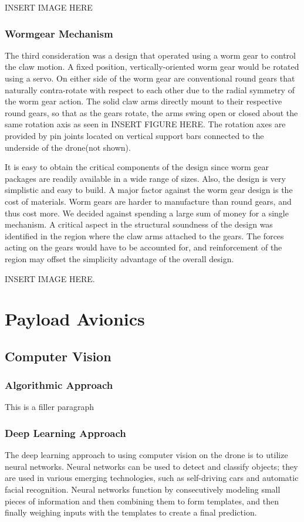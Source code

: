 			INSERT IMAGE HERE

		\subsubsection{Wormgear Mechanism}
			The third consideration was a design that operated using a worm gear to control the claw motion. A fixed position, vertically-oriented worm gear would be rotated using a servo. On either side of the worm gear are conventional round gears that naturally contra-rotate with respect to each other due to the radial symmetry of the worm gear action. The solid claw arms directly mount to their respective round gears, so that as the gears rotate, the arms swing open or closed about the same rotation axis as seen in INSERT FIGURE HERE. The rotation axes are provided by pin joints located on vertical support bars connected to the underside of the drone(not shown).

			It is easy to obtain the critical components of the design since worm gear packages are readily available in a wide range of sizes. Also, the design is very simplistic and easy to build. A major factor against the worm gear design is the cost of materials. Worm gears are harder to manufacture than round gears, and thus cost more. We decided against spending a large sum of money for a single mechanism. A critical aspect in the structural soundness of the design was identified in the region where the claw arms attached to the gears. The forces acting on the gears would have to be accounted for, and reinforcement of the region may offset the simplicity advantage of the overall design.
			
			INSERT IMAGE HERE.

\section{Payload Avionics}\label{PL:Tradeoffs:Avionics}
	\subsection{Computer Vision}
		\subsubsection{Algorithmic Approach}
			This is a filler paragraph

		\subsubsection{Deep Learning Approach}
			The deep learning approach to using computer vision on the drone is to utilize neural networks. Neural networks can be used to detect and classify objects; they are used in various emerging technologies, such as self-driving cars and automatic facial recognition. 
			Neural networks function by consecutively modeling small pieces of information and then combining them to form templates, and then finally weighing inputs with the templates to create a final prediction.
		
